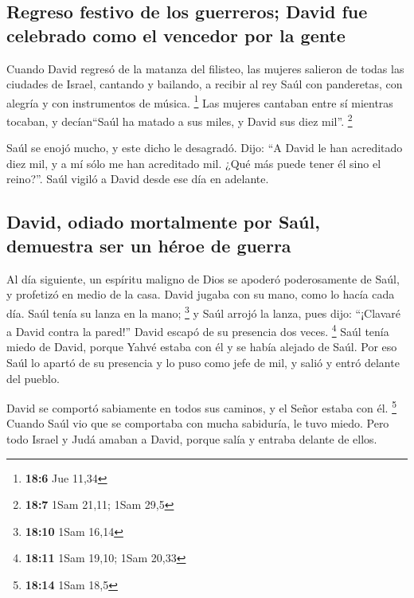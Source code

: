 \hypertarget{regreso-festivo-de-los-guerreros-david-fue-celebrado-como-el-vencedor-por-la-gente}{%
\subsection{Regreso festivo de los guerreros; David fue celebrado como
el vencedor por la
gente}\label{regreso-festivo-de-los-guerreros-david-fue-celebrado-como-el-vencedor-por-la-gente}}

 Cuando David regresó de la matanza del filisteo, las
mujeres salieron de todas las ciudades de Israel, cantando y bailando, a
recibir al rey Saúl con panderetas, con alegría y con instrumentos de
música. \footnote{\textbf{18:6} Jue 11,34}  Las mujeres
cantaban entre sí mientras tocaban, y decían``Saúl ha matado a sus
miles, y David sus diez mil''. \footnote{\textbf{18:7} 1Sam 21,11; 1Sam
  29,5}

 Saúl se enojó mucho, y este dicho le desagradó. Dijo: ``A
David le han acreditado diez mil, y a mí sólo me han acreditado mil.
¿Qué más puede tener él sino el reino?''.  Saúl vigiló a
David desde ese día en adelante.

\hypertarget{david-odiado-mortalmente-por-sauxfal-demuestra-ser-un-huxe9roe-de-guerra}{%
\subsection{David, odiado mortalmente por Saúl, demuestra ser un héroe
de
guerra}\label{david-odiado-mortalmente-por-sauxfal-demuestra-ser-un-huxe9roe-de-guerra}}

 Al día siguiente, un espíritu maligno de Dios se apoderó
poderosamente de Saúl, y profetizó en medio de la casa. David jugaba con
su mano, como lo hacía cada día. Saúl tenía su lanza en la mano;
\footnote{\textbf{18:10} 1Sam 16,14}  y Saúl arrojó la
lanza, pues dijo: ``¡Clavaré a David contra la pared!'' David escapó de
su presencia dos veces. \footnote{\textbf{18:11} 1Sam 19,10; 1Sam 20,33}
 Saúl tenía miedo de David, porque Yahvé estaba con él y
se había alejado de Saúl.  Por eso Saúl lo apartó de su
presencia y lo puso como jefe de mil, y salió y entró delante del
pueblo.

 David se comportó sabiamente en todos sus caminos, y el
Señor estaba con él. \footnote{\textbf{18:14} 1Sam 18,5} 
Cuando Saúl vio que se comportaba con mucha sabiduría, le tuvo miedo.
 Pero todo Israel y Judá amaban a David, porque salía y
entraba delante de ellos.

